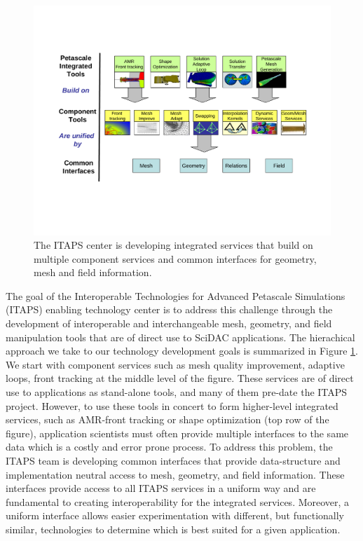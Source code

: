\documentclass{article}
\begin{document}
\begin{figure}[htb] 
\begin{center}
\includegraphics[angle=270,clip=true,viewport=1in .5in 7.5in 11in,width=6.5in]{figures/big-picture.pdf}
\end{center}
\vspace{-4\baselineskip}
\caption{The ITAPS center is
developing integrated services that build on multiple
component services and common interfaces for geometry, mesh and field
information.}
\label{fig:big_picture}
\end{figure}

The goal of the Interoperable Technologies for Advanced Petascale
Simulations (ITAPS) enabling technology center is to address this
challenge through the development of interoperable and interchangeable
mesh, geometry, and field manipulation tools that are of direct use to
SciDAC applications.  The hierachical approach we take to our
technology development goals is summarized in Figure
\ref{fig:big_picture}.  We start with component services
such as mesh quality improvement, adaptive loops, front tracking at
the middle level of the figure.  These services are of direct use to
applications as stand-alone tools, and many of them pre-date
the ITAPS project.  However, to use these tools in concert to form
higher-level integrated services, such as AMR-front tracking or shape
optimization (top row of the figure), application scientists must
often provide multiple interfaces to the same data which is a costly
and error prone process.  To address this problem, the ITAPS team is
developing common interfaces that provide data-structure and
implementation neutral access to mesh, geometry, and field
information.  These interfaces provide access to all ITAPS services in
a uniform way and are fundamental to creating interoperability for the
integrated services.  Moreover, a uniform interface allows easier
experimentation with different, but functionally similar, technologies
to determine which is best suited for a given application.\\
\end{document}
